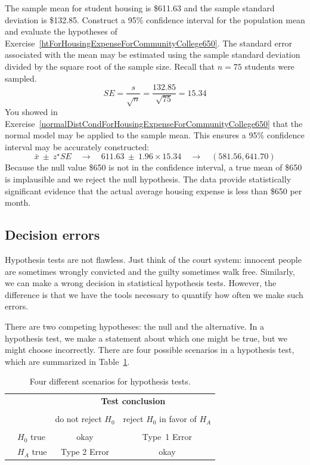\begin{example}{The sample mean for student housing is \$611.63 and the sample standard deviation is \$132.85. Construct a 95\% confidence interval for the population mean and evaluate the hypotheses of Exercise~\ref{htForHousingExpenseForCommunityCollege650}.}
The standard error associated with the mean may be estimated using the sample standard deviation divided by the square root of the sample size. Recall that $n=75$ students were sampled.
$$ SE = \frac{s}{\sqrt{n}} = \frac{132.85}{\sqrt{75}} = 15.34 $$
You showed in Exercise~\ref{normalDistCondForHousingExpenseForCommunityCollege650} that the normal model may be applied to the sample mean. This ensures a 95\% confidence interval may be accurately constructed:
$$\bar{x}\ \pm\ z^{\star} SE \quad\to\quad 611.63\ \pm\ 1.96 \times  15.34 \quad \to \quad (581.56, 641.70) $$
Because the null value \$650 is not in the confidence interval, a true mean of \$650 is implausible and we reject the null hypothesis. The data provide statistically significant evidence that the actual average housing expense is less than \$650 per month.
\end{example}


\subsection{Decision errors}


Hypothesis tests are not flawless. Just think of the court system: innocent people are sometimes wrongly convicted and the guilty sometimes walk free. Similarly, we can make a wrong decision in statistical hypothesis tests. However, the difference is that we have the tools necessary to quantify how often we make such errors.

There are two competing hypotheses: the null and the alternative. In a hypothesis test, we make a statement about which one might be true, but we might choose incorrectly. There are four possible scenarios in a hypothesis test, which are summarized in Table~\ref{fourHTScenarios}.

\begin{table}[ht]
\centering
\begin{tabular}{l l c c}
& & \multicolumn{2}{c}{\textbf{Test conclusion}} \\
  \cline{3-4}
\vspace{-3.7mm} \\
& & do not reject $H_0$ &  reject $H_0$ in favor of $H_A$ \\
  \cline{2-4}
\vspace{-3.7mm} \\
& $H_0$ true & okay &  Type~1 Error \\
\raisebox{1.5ex}{\textbf{Truth}} & $H_A$ true & Type 2 Error & okay \\
  \cline{2-4}
\end{tabular}
\caption{Four different scenarios for hypothesis tests.}
\label{fourHTScenarios}
\end{table}

